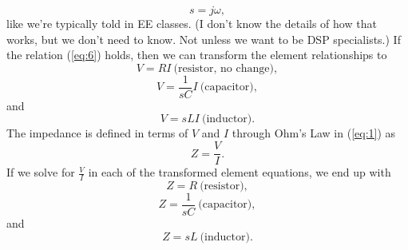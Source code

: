 \begin{equation}
\label{eq:6}
s = j \omega,
\end{equation}
like we're typically told in EE classes. (I don't know the details of how that works, but we don't need to know. Not unless we want to be DSP specialists.)
If the relation (\ref{eq:6}) holds, then we can transform the element relationships to
\begin{equation}
\label{eq:7}
V = R I ~\text{(resistor, no change)},
\end{equation}
\begin{equation}
\label{eq:8}
V = \frac{1}{s C} I ~\text{(capacitor)},
\end{equation}
and
\begin{equation}
\label{eq:9}
V = s L I ~\text{(inductor)}.
\end{equation}
The impedance is defined in terms of $V$ and $I$ through Ohm's Law in (\ref{eq:1}) as
\begin{equation}
\label{eq:10}
Z = \frac{V}{I}.
\end{equation}
If we solve for $\frac{V}{I}$ in each of the transformed element equations, we end up with
\begin{equation}
\label{eq:11}
Z = R ~\text{(resistor)},
\end{equation}
\begin{equation}
\label{eq:12}
Z = \frac{1}{s C} ~\text{(capacitor)},
\end{equation}
and
\begin{equation}
\label{eq:13}
Z = s L ~\text{(inductor)}.
\end{equation}
